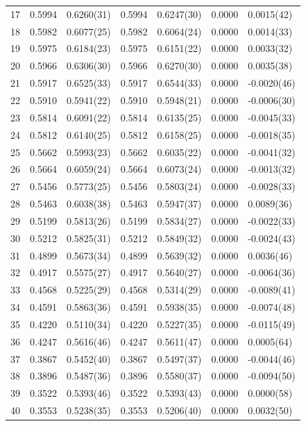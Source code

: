 \documentclass[aps, prc, tightenlines,superscriptaddress, letterpaper, amsmath, amssymb, preprintnumbers, floatfix, longbibliography, nofootinbib]{revtex4-2}
\begin{document}
\begin{table}[!htb]
{\begin{tabularx}{\textwidth}{| c || Y | Y | Y | Y | Y | Y |}
17	&	0.5994	&	0.6260(31)	&	0.5994	&	0.6247(30)	&	0.0000	&	0.0015(42)	\\
18	&	0.5982	&	0.6077(25)	&	0.5982	&	0.6064(24)	&	0.0000	&	0.0014(33)	\\
19	&	0.5975	&	0.6184(23)	&	0.5975	&	0.6151(22)	&	0.0000	&	0.0033(32)	\\
20	&	0.5966	&	0.6306(30)	&	0.5966	&	0.6270(30)	&	0.0000	&	0.0035(38)	\\
21	&	0.5917	&	0.6525(33)	&	0.5917	&	0.6544(33)	&	0.0000	&	-0.0020(46)	\\
22	&	0.5910	&	0.5941(22)	&	0.5910	&	0.5948(21)	&	0.0000	&	-0.0006(30)	\\
23	&	0.5814	&	0.6091(22)	&	0.5814	&	0.6135(25)	&	0.0000	&	-0.0045(33)	\\
24	&	0.5812	&	0.6140(25)	&	0.5812	&	0.6158(25)	&	0.0000	&	-0.0018(35)	\\
25	&	0.5662	&	0.5993(23)	&	0.5662	&	0.6035(22)	&	0.0000	&	-0.0041(32)	\\
26	&	0.5664	&	0.6059(24)	&	0.5664	&	0.6073(24)	&	0.0000	&	-0.0013(32)	\\
27	&	0.5456	&	0.5773(25)	&	0.5456	&	0.5803(24)	&	0.0000	&	-0.0028(33)	\\
28	&	0.5463	&	0.6038(38)	&	0.5463	&	0.5947(37)	&	0.0000	&	0.0089(36)	\\
29	&	0.5199	&	0.5813(26)	&	0.5199	&	0.5834(27)	&	0.0000	&	-0.0022(33)	\\
30	&	0.5212	&	0.5825(31)	&	0.5212	&	0.5849(32)	&	0.0000	&	-0.0024(43)	\\
31	&	0.4899	&	0.5673(34)	&	0.4899	&	0.5639(32)	&	0.0000	&	0.0036(46)	\\
32	&	0.4917	&	0.5575(27)	&	0.4917	&	0.5640(27)	&	0.0000	&	-0.0064(36)	\\
33	&	0.4568	&	0.5225(29)	&	0.4568	&	0.5314(29)	&	0.0000	&	-0.0089(41)	\\
34	&	0.4591	&	0.5863(36)	&	0.4591	&	0.5938(35)	&	0.0000	&	-0.0074(48)	\\
35	&	0.4220	&	0.5110(34)	&	0.4220	&	0.5227(35)	&	0.0000	&	-0.0115(49)	\\
36	&	0.4247	&	0.5616(46)	&	0.4247	&	0.5611(47)	&	0.0000	&	0.0005(64)	\\
37	&	0.3867	&	0.5452(40)	&	0.3867	&	0.5497(37)	&	0.0000	&	-0.0044(46)	\\
38	&	0.3896	&	0.5487(36)	&	0.3896	&	0.5580(37)	&	0.0000	&	-0.0094(50)	\\
39	&	0.3522	&	0.5393(46)	&	0.3522	&	0.5393(43)	&	0.0000	&	0.0000(58)	\\
40	&	0.3553	&	0.5238(35)	&	0.3553	&	0.5206(40)	&	0.0000	&	0.0032(50)	\\

\end{tabularx}}
\end{table}
\end{document}
